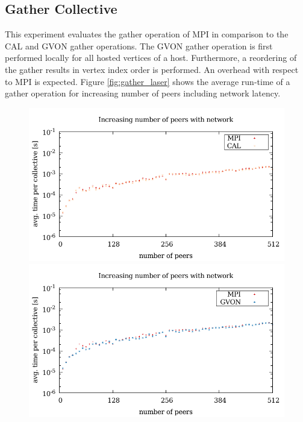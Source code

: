 \subsection*{Gather Collective}
This experiment evaluates the gather operation of MPI in comparison to
the CAL and GVON gather operations.  The GVON gather operation is first performed locally
for all hosted vertices of a host. Furthermore, a reordering of the
gather results in vertex index order is performed. An overhead with
respect to MPI is expected.  Figure \ref{fig:gather_laser} shows the
average run-time of a gather operation for increasing number of peers
including network latency.

\begin{figure}[H]
  \begin{minipage}[t]{0.5\textwidth}
    \includegraphics[width=\textwidth]{plots/50_collective_network_cal_laser}
    \includegraphics[width=\textwidth]{plots/50_collective_network_gvon_laser}

\end{minipage}
\end{figure}
